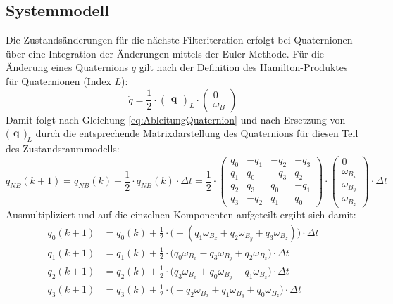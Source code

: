 \documentclass[12pt,a4paper]{article}
\begin{document}
		\subsection{Systemmodell}\label{subsec:Systemmodell}
		Die Zustandsänderungen für die nächste Filteriteration erfolgt bei Quaternionen über eine Integration der Änderungen mittels der Euler-Methode. Für die Änderung eines Quaternions $q$ gilt nach der Definition des Hamilton-Produktes für Quaternionen (Index $L$):
		\begin{equation}\label{eq:AbleitungQuaternion}
			\dot q =\frac{1}{2}\cdot \begin{pmatrix}\textbf{q}\end{pmatrix}_{L}\cdot \begin{pmatrix}0\\\omega_{B}\end{pmatrix}
		\end{equation}
		Damit folgt nach Gleichung \ref{eq:AbleitungQuaternion} und nach Ersetzung von $\big(\begin{smallmatrix*}
		\textbf{q}
		\end{smallmatrix*}\big)_{L}$ durch die entsprechende Matrixdarstellung des Quaternions für diesen Teil des Zustandsraummodells:
		\begin{equation}\label{eq:ZustandsgleichungQuaternionAllgemein}
			q_{NB}(k+1)=q_{NB}(k)+\frac{1}{2}\cdot \dot{q}_{NB}(k)\cdot \Delta t=\frac{1}{2}\cdot \begin{pmatrix}
			q_{0 }& -q_{1} & -q_{2} & -q_{3} \\
			q_{1 }& q_{0} & -q_{3} & q_{2} \\
			q_{2} & q_{3} & q_{0} & -q_{1} \\
			q_{3} & -q_{2} & q_{1} & q_{0}
			\end{pmatrix}\cdot
			\begin{pmatrix}
			0\\
			\omega_{B_{x}}\\
			\omega_{B_{y}}\\
			\omega_{B_{z}}
			\end{pmatrix}\cdot \Delta t
		\end{equation}
		Ausmultipliziert und auf die einzelnen Komponenten aufgeteilt ergibt sich damit:
		\begin{align}\label{eq:ZustandsgleichungQuaternionSpeziell}
			q_{0}(k+1)&=q_{0}(k)+\frac{1}{2}\cdot \big(-(q_{1}\omega_{B_{x}}+q_{2}\omega_{B_{y}}+q_{3}\omega_{B_{z}})\big)\cdot \Delta t\\
			q_{1}(k+1)&=q_{1}(k)+\frac{1}{2}\cdot \big(q_{0}\omega_{B_{x}}-q_{3}\omega_{B_{y}}+q_{2}\omega_{B_{z}}\big)\cdot \Delta t\\
			q_{2}(k+1)&=q_{2}(k)+\frac{1}{2}\cdot \big(q_{3}\omega_{B_{x}}+q_{0}\omega_{B_{y}}-q_{1}\omega_{B_{z}}\big)\cdot \Delta t\\
			q_{3}(k+1)&=q_{3}(k)+\frac{1}{2}\cdot \big(-q_{2}\omega_{B_{x}}+q_{1}\omega_{B_{y}}+q_{0}\omega_{B_{z}}\big)\cdot \Delta t
		\end{align}
\end{document}
